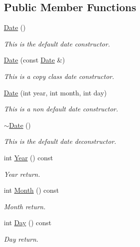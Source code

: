 \subsection*{Public Member Functions}
\begin{DoxyCompactItemize}
\item 
\hyperlink{class_date_a4e59ed4ba66eec61c27460c5d09fa1bd}{Date} ()
\begin{DoxyCompactList}\small\item\em This is the default date constructor. \end{DoxyCompactList}\item 
\hyperlink{class_date_afa65693475fb86a2de04c8578b232201}{Date} (const \hyperlink{class_date}{Date} \&)
\begin{DoxyCompactList}\small\item\em This is a copy class date constructor. \end{DoxyCompactList}\item 
\hyperlink{class_date_a5874432b5f7339205866055201e885d7}{Date} (int year, int month, int day)
\begin{DoxyCompactList}\small\item\em This is a non default date constructor. \end{DoxyCompactList}\item 
\hyperlink{class_date_ade4b469433b7966cc034cbcc6799233b}{$\sim$\+Date} ()
\begin{DoxyCompactList}\small\item\em This is the default date deconstructor. \end{DoxyCompactList}\item 
int \hyperlink{class_date_a3b9f9ebc5d79571606b30363b6121386}{Year} () const 
\begin{DoxyCompactList}\small\item\em Year return. \end{DoxyCompactList}\item 
int \hyperlink{class_date_a173d22f7c4671d3ad54b76994913967e}{Month} () const 
\begin{DoxyCompactList}\small\item\em Month return. \end{DoxyCompactList}\item 
int \hyperlink{class_date_a471379b5d940e5f8231d083e308110b9}{Day} () const 
\begin{DoxyCompactList}\small\item\em Day return. \end{DoxyCompactList}\item 

\end{DoxyCompactItemize}
